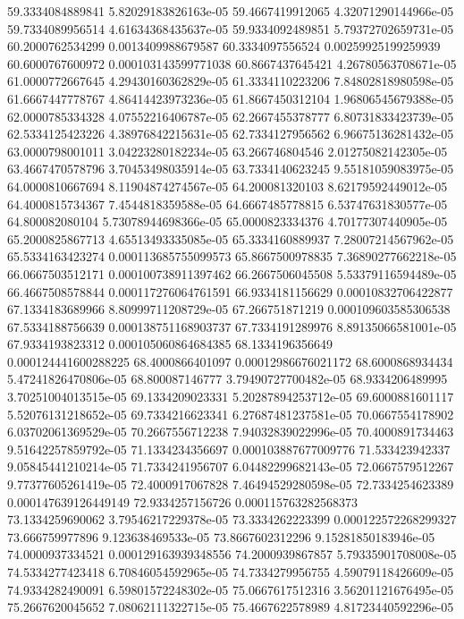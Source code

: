 {59.3334084889841 5.82029183826163e-05
59.4667419912065 4.32071290144966e-05
59.7334089956514 4.61634368435637e-05
59.9334092489851 5.79372702659731e-05
60.2000762534299 0.0013409988679587
60.3334097556524 0.00259925199259939
60.6000767600972 0.000103143599771038
60.8667437645421 4.26780563708671e-05
61.0000772667645 4.29430160362829e-05
61.3334110223206 7.84802818980598e-05
61.6667447778767 4.86414423973236e-05
61.8667450312104 1.96806545679388e-05
62.0000785334328 4.07552216406787e-05
62.2667455378777 6.80731833423739e-05
62.5334125423226 4.38976842215631e-05
62.7334127956562 6.96675136281432e-05
63.0000798001011 3.04223280182234e-05
63.266746804546 2.01275082142305e-05
63.4667470578796 3.70453498035914e-05
63.7334140623245 9.55181059083975e-05
64.0000810667694 8.11904874274567e-05
64.200081320103 8.62179592449012e-05
64.4000815734367 7.4544818359588e-05
64.6667485778815 6.53747631830577e-05
64.800082080104 5.73078944698366e-05
65.0000823334376 4.70177307440905e-05
65.2000825867713 4.65513493335085e-05
65.3334160889937 7.28007214567962e-05
65.5334163423274 0.000113685755099573
65.8667500978835 7.36890277662218e-05
66.0667503512171 0.000100738911397462
66.2667506045508 5.53379116594489e-05
66.4667508578844 0.000117276064761591
66.9334181156629 0.00010832706422877
67.1334183689966 8.80999711208729e-05
67.266751871219 0.000109603585306538
67.5334188756639 0.000138751168903737
67.7334191289976 8.89135066581001e-05
67.9334193823312 0.000105060864684385
68.1334196356649 0.000124441600288225
68.4000866401097 0.00012986676021172
68.6000868934434 5.47241826470806e-05
68.800087146777 3.79490727700482e-05
68.9334206489995 3.70251004013515e-05
69.1334209023331 5.20287894253712e-05
69.6000881601117 5.52076131218652e-05
69.7334216623341 6.27687481237581e-05
70.0667554178902 6.03702061369529e-05
70.2667556712238 7.94032839022996e-05
70.4000891734463 9.51642257859792e-05
71.1334234356697 0.000103887677009776
71.533423942337 9.05845441210214e-05
71.7334241956707 6.04482299682143e-05
72.0667579512267 9.77377605261419e-05
72.4000917067828 7.46494529280598e-05
72.7334254623389 0.000147639126449149
72.9334257156726 0.000115763282568373
73.1334259690062 3.79546217229378e-05
73.3334262223399 0.000122572268299327
73.666759977896 9.123638469533e-05
73.8667602312296 9.15281850183946e-05
74.0000937334521 0.000129163939348556
74.2000939867857 5.79335901708008e-05
74.5334277423418 6.70846054592965e-05
74.7334279956755 4.59079118426609e-05
74.9334282490091 6.59801572248302e-05
75.0667617512316 3.56201121676495e-05
75.2667620045652 7.08062111322715e-05
75.4667622578989 4.81723440592296e-05
}
